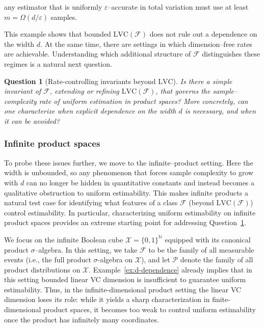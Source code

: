 \documentclass[arxiv]{colt2026}
\newtheorem{question}[theorem]{Question}
\newcommand{\X}{\mathcal{X}}
\newcommand{\F}{\mathcal{F}}
\newcommand{\Pc}{\mathcal{P}}
\newcommand{\eps}{\varepsilon}
\newcommand{\LVC}{\mathrm{LVC}}
\begin{document}
\vspace{-0.3em}
any estimator that is uniformly $\eps$--accurate in total variation must use at
least $m=\Omega(d/\eps)$ samples.

This example shows that bounded $\LVC(\F)$ does not rule out a dependence on the
width $d$.
At the same time, there are settings in which dimension--free rates are
achievable.
Understanding which additional structure of $\F$ distinguishes these regimes is
a natural next question.

\vspace{-0.5em}
\begin{question}[Rate-controlling invariants beyond $\LVC$]
\label{q:rates}
Is there a simple invariant of $\F$, extending or refining
$\LVC(\F)$, that governs the \emph{sample--complexity rate} of uniform estimation
in product spaces?
More concretely, can one characterize when explicit dependence on the width $d$ is necessary, and when it can be avoided?
\end{question}

\vspace{-1em}
\subsubsection{Infinite product spaces}\label{subsubsec:infinite-product}
To probe these issues further, we move to the infinite--product setting.
{Here the width is unbounded, so any phenomenon that forces sample complexity to
grow with $d$ can no longer be hidden in quantitative constants and instead
becomes a qualitative obstruction to uniform estimability.
This makes infinite products a natural test case for identifying what features
of a class $\F$ (beyond $\LVC(\F)$) control estimability.
In particular, characterizing uniform estimability on infinite product spaces
provides an extreme starting point for addressing
Question~\ref{q:rates}.}

We focus on the infinite Boolean cube $\X=\{0,1\}^{\mathbb N}$ equipped with its
canonical product $\sigma$--algebra.
In this setting, we take $\F$ to be the family of all measurable events
(i.e., the full product $\sigma$-algebra on $\X$), and let $\Pc$
denote the family of all product distributions on $\X$.
Example~\ref{ex:d-dependence} already implies that in this setting bounded linear
VC dimension is insufficient to guarantee uniform estimability.
{Thus, in the infinite-dimensional product setting the linear VC dimension loses
its role: while it yields a sharp characterization in finite-dimensional product
spaces, it becomes too weak to control uniform estimability once the product has
infinitely many coordinates.}
\end{document}
